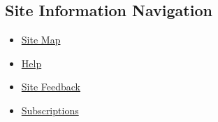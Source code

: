 \hypertarget{site-information-navigation-1}{%
\subsection{Site Information
Navigation}\label{site-information-navigation-1}}

\begin{itemize}
\tightlist
\item
  \href{https://spiderbites.nytimes.com}{Site Map}
\item
  \href{https://help.nytimes.com/hc/en-us}{Help}
\item
  \href{https://help.nytimes.com/hc/en-us/articles/115015385887-Contact-Us?redir=myacc}{Site
  Feedback}
\item
  \href{https://www.nytimes.com/subscription?campaignId=37WXW}{Subscriptions}
\end{itemize}
